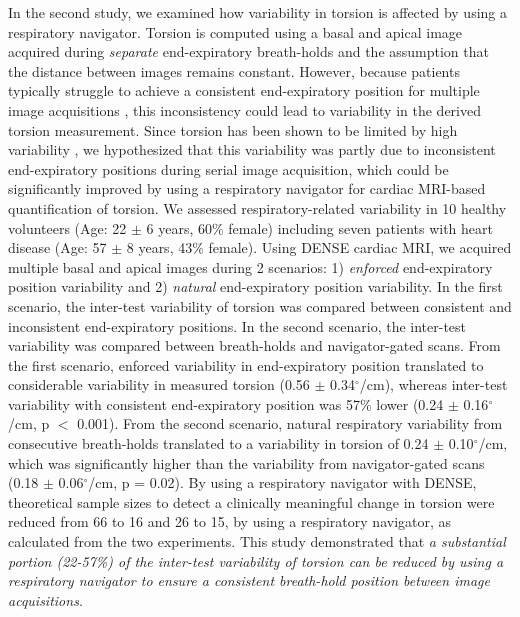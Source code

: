 	In the second study, we examined how variability in torsion is affected by using a respiratory navigator. Torsion is computed using a basal and apical image acquired during \textit{separate} end-expiratory breath-holds and the assumption that the distance between images remains constant. However, because patients typically struggle to achieve a consistent end-expiratory position for multiple image acquisitions \cite{Liu1993,Wang1995a,Taylor1997a,Holland1998c,Fischer2006a}, this inconsistency could lead to variability in the derived torsion measurement. Since torsion has been shown to be limited by high variability \cite{Donekal2013a}, we hypothesized that this variability was partly due to inconsistent end-expiratory positions during serial image acquisition, which could be significantly improved by using a respiratory navigator for cardiac MRI-based quantification of torsion. We assessed respiratory-related variability in 10 healthy volunteers (Age: 22 $\pm$ 6 years, 60\% female) including seven patients with heart disease (Age: 57 $\pm$ 8 years, 43\% female). Using DENSE cardiac MRI, we acquired multiple basal and apical images during 2 scenarios: 1) \textit{enforced} end-expiratory position variability and 2) \textit{natural} end-expiratory position variability. In the first scenario, the inter-test variability of torsion was compared between consistent and inconsistent end-expiratory positions. In the second scenario, the inter-test variability was compared between breath-holds and navigator-gated scans. From the first scenario, enforced variability in end-expiratory position translated to considerable variability in measured torsion (0.56 $\pm$ 0.34$^{\circ}$/cm), whereas inter-test variability with consistent end-expiratory position was 57\% lower (0.24 $\pm$ 0.16$^{\circ}$/cm, p $<$ 0.001). From the second scenario, natural respiratory variability from consecutive breath-holds translated to a variability in torsion of 0.24 $\pm$ 0.10$^{\circ}$/cm, which was significantly higher than the variability from navigator-gated scans (0.18 $\pm$ 0.06$^{\circ}$/cm, p = 0.02). By using a respiratory navigator with DENSE, theoretical sample sizes to detect a clinically meaningful change in torsion were reduced from 66 to 16 and 26 to 15, by using a respiratory navigator, as calculated from the two experiments. This study demonstrated that \textit{a substantial portion (22-57\%) of the inter-test variability of torsion can be reduced by using a respiratory navigator to ensure a consistent breath-hold position between image acquisitions.}

